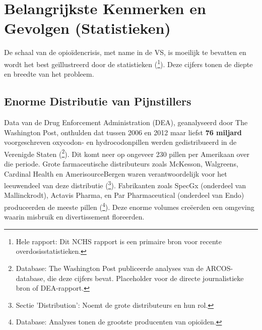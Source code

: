 \documentclass[11pt, a4paper]{report} %
\begin{document}
\section{Belangrijkste Kenmerken en Gevolgen (Statistieken)}
De schaal van de opioïdencrisis, met name in de VS, is moeilijk te bevatten en wordt het best geïllustreerd door de statistieken (\cite{Ahmad2024ProvisionalOverdoseDeaths}\footnote{Hele rapport: Dit NCHS rapport is een primaire bron voor recente overdosisstatistieken.}). Deze cijfers tonen de diepte en breedte van het probleem.

\subsection{Enorme Distributie van Pijnstillers}
Data van de Drug Enforcement Administration (DEA), geanalyseerd door The Washington Post, onthulden dat tussen 2006 en 2012 maar liefst \textbf{76 miljard} voorgeschreven oxycodon- en hydrocodonpillen werden gedistribueerd in de Verenigde Staten (\cite{WashingtonPostARCOSData}\footnote{Database: The Washington Post publiceerde analyses van de ARCOS-database, die deze cijfers bevat. Placeholder voor de directe journalistieke bron of DEA-rapport.}). Dit komt neer op ongeveer 230 pillen per Amerikaan over die periode. Grote farmaceutische distributeurs zoals McKesson, Walgreens, Cardinal Health en AmerisourceBergen waren verantwoordelijk voor het leeuwendeel van deze distributie (\cite{WikipediaOpioidEpidemicUS}\footnote{Sectie 'Distribution': Noemt de grote distributeurs en hun rol.}). Fabrikanten zoals SpecGx (onderdeel van Mallinckrodt), Actavis Pharma, en Par Pharmaceutical (onderdeel van Endo) produceerden de meeste pillen (\cite{WashingtonPostARCOSData}\footnote{Database: Analyses tonen de grootste producenten van opioïden.}). Deze enorme volumes creëerden een omgeving waarin misbruik en divertissement floreerden.
\end{document}
